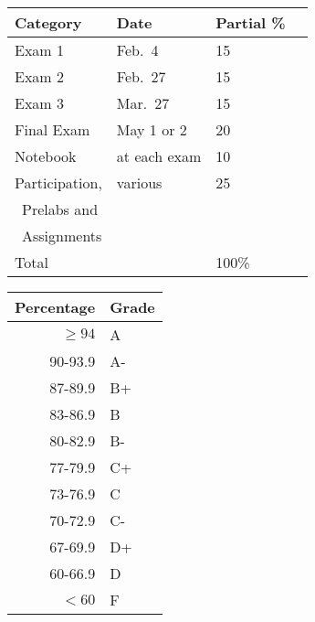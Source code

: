 \documentclass{tufte-handout}
\begin{document}
\begin{tabular}{l l l r}
Category &  Date & Partial \%  \\
\hline
 Exam 1 & Feb.\ 4 & 15 \\							%
 Exam 2 & Feb.\ 27 & 15 \\							%
 Exam 3 & Mar.\ 27 & 15 \\						%
 Final Exam & May 1 or 2 & 20 \\ 							%
 Notebook & at each exam & 10 \\
Participation,  &  various  & 25 \\
\, Prelabs and \\
\, Assignments \\
\hline
Total & &   100\%
\end{tabular}


\begin{margintable}
\begin{tabular}{rl}
Percentage & Grade \\
\hline 
$\ge94$ & A \\
90-93.9 & A- \\
87-89.9 & B+ \\
83-86.9 & B \\
80-82.9 & B- \\
77-79.9 & C+ \\
73-76.9 & C \\
70-72.9 & C- \\
67-69.9 & D+ \\
60-66.9 & D \\
$<60$ & F \\
\hline
\end{tabular}
\end{margintable}
\end{document}
